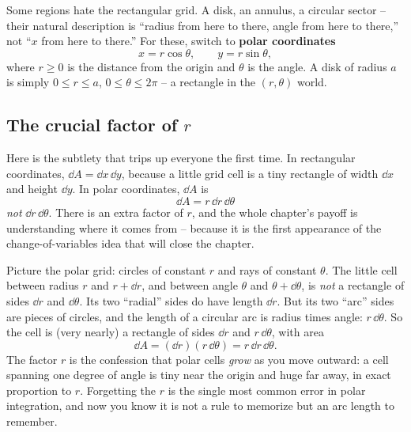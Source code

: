 Some regions hate the rectangular grid. A disk, an annulus, a circular sector --
their natural description is ``radius from here to there, angle from here to
there,'' not ``$x$ from here to there.'' For these, switch to \textbf{polar
coordinates}
\[
  x=r\cos\theta,\qquad y=r\sin\theta,
\]
where $r\ge 0$ is the distance from the origin and $\theta$ is the angle. A disk
of radius $a$ is simply $0\le r\le a$, $0\le\theta\le 2\pi$ -- a rectangle in the
$(r,\theta)$ world.

\subsection{The crucial factor of $r$}

Here is the subtlety that trips up everyone the first time. In rectangular
coordinates, $\dd A=\dd x\,\dd y$, because a little grid cell is a tiny rectangle
of width $\dd x$ and height $\dd y$. In polar coordinates, $\dd A$ is
\[
  \boxed{\;\dd A=r\,\dd r\,\dd\theta\;}
\]
\emph{not} $\dd r\,\dd\theta$. There is an extra factor of $r$, and the whole
chapter's payoff is understanding where it comes from -- because it is the first
appearance of the change-of-variables idea that will close the chapter.

\begin{happeningbox}
Picture the polar grid: circles of constant $r$ and rays of constant $\theta$.
The little cell between radius $r$ and $r+\dd r$, and between angle $\theta$ and
$\theta+\dd\theta$, is \emph{not} a rectangle of sides $\dd r$ and $\dd\theta$.
Its two ``radial'' sides do have length $\dd r$. But its two ``arc'' sides are
pieces of circles, and the length of a circular arc is radius times angle:
$r\,\dd\theta$. So the cell is (very nearly) a rectangle of sides $\dd r$ and
$r\,\dd\theta$, with area
\[
  \dd A=(\dd r)(r\,\dd\theta)=r\,\dd r\,\dd\theta .
\]
The factor $r$ is the confession that polar cells \emph{grow} as you move
outward: a cell spanning one degree of angle is tiny near the origin and huge far
away, in exact proportion to $r$. Forgetting the $r$ is the single most common
error in polar integration, and now you know it is not a rule to memorize but an
arc length to remember.
\end{happeningbox}

